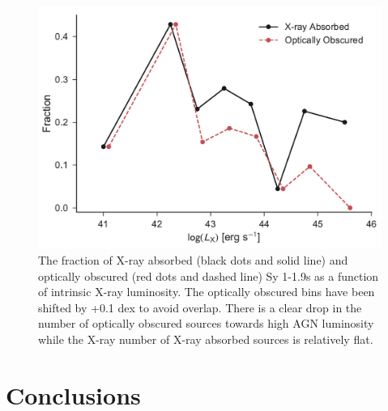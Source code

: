 \documentclass[twocolumn,trackchanges]{aastex6}
\begin{document}
\begin{figure}
\includegraphics[width=\columnwidth]{../figures/frac_blagn_xray_abs_and_opt_obs_vs_lx.pdf}
\caption{\label{fig:frac_xabs} The fraction of X-ray absorbed (black dots and solid line) and optically obscured (red dots and dashed line) Sy 1-1.9s as a function of intrinsic X-ray luminosity. The optically obscured bins have been shifted by +0.1 dex to avoid overlap. There is a clear drop in the number of optically obscured sources towards high AGN luminosity while the X-ray number of X-ray absorbed sources is relatively flat.}
\end{figure}



\section{Conclusions}\label{sec:conclude}

\acknowledgments
\facilities{}
	


\end{document}
